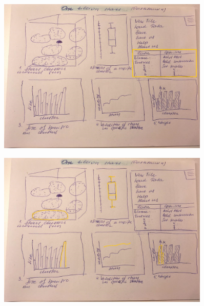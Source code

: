 \documentclass{article}
\begin{document}
\begin{itemize}
\begin{figure}[!h]
\centering
\includegraphics[width=0.9\textwidth]{images/Scenario4.jpg}
\label{fig17}
\end{figure}
\newpage
\begin{figure}[!h]
\centering
\includegraphics[width=0.9\textwidth]{images/Scenario42.jpg}
\label{fig18}
\end{figure}


\end{itemize}
\end{document}
